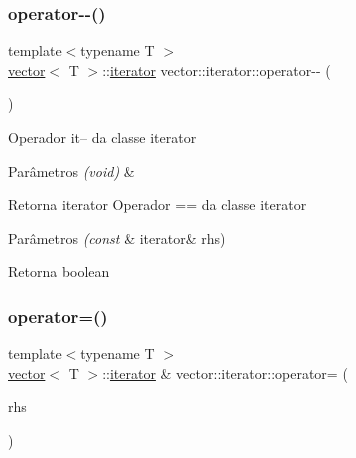 \subsubsection{\texorpdfstring{operator-\/-\/()}{operator--()}\hspace{0.1cm}{\footnotesize\ttfamily [2/2]}}
{\footnotesize\ttfamily template$<$typename T $>$ \\
\mbox{\hyperlink{classsc_1_1vector}{vector}}$<$ T $>$\+::\mbox{\hyperlink{classsc_1_1vector_1_1iterator}{iterator}} vector\+::iterator\+::operator-\/-\/ (\begin{DoxyParamCaption}\item[{int}]{ }\end{DoxyParamCaption})}

Operador it-- da classe iterator 
\begin{DoxyParams}{Parâmetros}
{\em (void)} & \\
\hline
\end{DoxyParams}
\begin{DoxyReturn}{Retorna}
iterator  Operador == da classe iterator 
\end{DoxyReturn}

\begin{DoxyParams}{Parâmetros}
{\em (const} & iterator\& rhs) \\
\hline
\end{DoxyParams}
\begin{DoxyReturn}{Retorna}
boolean 
\end{DoxyReturn}
\mbox{\label{classsc_1_1vector_1_1iterator_afbc7dcbcd6f36d53176b749c2b4641dc}} 
\subsubsection{\texorpdfstring{operator=()}{operator=()}}
{\footnotesize\ttfamily template$<$typename T $>$ \\
\mbox{\hyperlink{classsc_1_1vector}{vector}}$<$ T $>$\+::\mbox{\hyperlink{classsc_1_1vector_1_1iterator}{iterator}} \& vector\+::iterator\+::operator= (\begin{DoxyParamCaption}\item[{const \mbox{\hyperlink{classsc_1_1vector_1_1iterator}{iterator}} \&}]{rhs }\end{DoxyParamCaption})}



